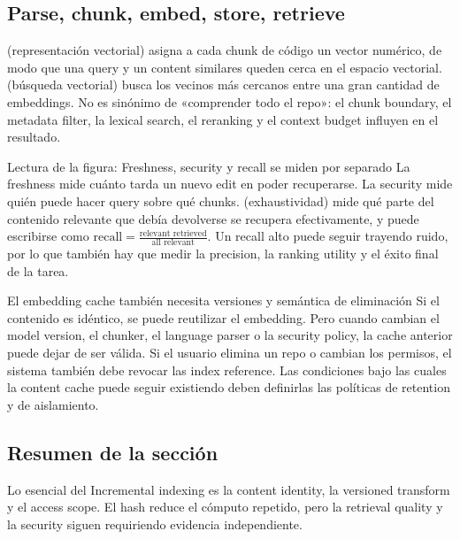 \subsection{Parse, chunk, embed, store, retrieve}

 (representación vectorial) asigna a cada chunk de código un vector numérico, de modo que una query y un content similares queden cerca en el espacio vectorial.  (búsqueda vectorial) busca los vecinos más cercanos entre una gran cantidad de embeddings. No es sinónimo de «comprender todo el repo»: el chunk boundary, el metadata filter, la lexical search, el reranking y el context budget influyen en el resultado.


\begin{knowledgebox}{Lectura de la figura: Freshness, security y recall se miden por separado}
La freshness mide cuánto tarda un nuevo edit en poder recuperarse. La security mide quién puede hacer query sobre qué chunks.  (exhaustividad) mide qué parte del contenido relevante que debía devolverse se recupera efectivamente, y puede escribirse como $\mathrm{recall}=\frac{\text{relevant retrieved}}{\text{all relevant}}$. Un recall alto puede seguir trayendo ruido, por lo que también hay que medir la precision, la ranking utility y el éxito final de la tarea.
\end{knowledgebox}

\begin{warningbox}{El embedding cache también necesita versiones y semántica de eliminación}
Si el contenido es idéntico, se puede reutilizar el embedding. Pero cuando cambian el model version, el chunker, el language parser o la security policy, la cache anterior puede dejar de ser válida. Si el usuario elimina un repo o cambian los permisos, el sistema también debe revocar las index reference. Las condiciones bajo las cuales la content cache puede seguir existiendo deben definirlas las políticas de retention y de aislamiento.
\end{warningbox}

\subsection{Resumen de la sección}

Lo esencial del Incremental indexing es la content identity, la versioned transform y el access scope. El hash reduce el cómputo repetido, pero la retrieval quality y la security siguen requiriendo evidencia independiente.
